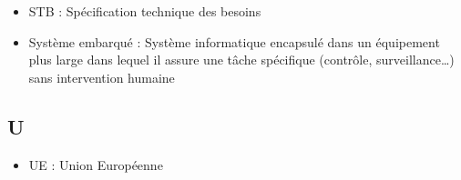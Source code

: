 \documentclass[a4paper]{article}
\begin{document}
\begin{itemize}
\item STB : Spécification technique des besoins
\item Système embarqué : Système informatique encapsulé dans un équipement plus large dans lequel il assure une tâche spécifique (contrôle, surveillance…) sans intervention humaine
\end{itemize}

\subsection{U}

\begin{itemize}
\item UE : Union Européenne
\end{itemize}
\end{document}

